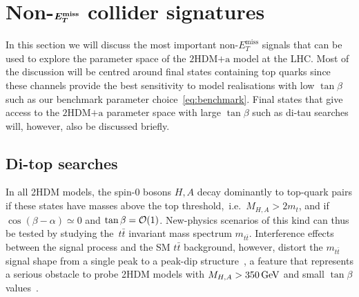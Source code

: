 \documentclass[a4paper, 11pt,notoc]{article}
\newcommand{\MET}{\ensuremath{E_T^\mathrm{miss}}\xspace}
\newcommand{\hdma}{\ensuremath{\textrm{2HDM+a}}\xspace}
\def\bm#1{\mbox{\boldmath$#1$\unboldmath}}
\begin{document}

\section{Non-$\bm{E_T^{\rm miss}}$ collider signatures}
\label{sec:nonMET}

In this section we will discuss the most important non-$\MET$ signals that can be used to explore the parameter space of the \hdma model at the LHC. Most of the discussion will be centred around final states containing top quarks since these channels provide the best sensitivity to model realisations with low $\tan \beta$ such as our benchmark parameter choice~\eqref{eq:benchmark}. Final states that give access to the \hdma parameter space with large $\tan \beta$ such as di-tau searches will, however, also be discussed briefly. 

\subsection{Di-top  searches}
\label{sec:ttbarresonances}

 In all 2HDM models, the spin-0 bosons $H,A$  decay dominantly to top-quark pairs if these states have masses above the top threshold,~i.e.~$M_{H, A} > 2 m_t$, and if $\cos (\beta - \alpha) \simeq 0$ and $\tan \beta = {\cal O}(1)$. New-physics scenarios of this kind can thus be tested by studying the~$t \bar t$ invariant mass spectrum $m_{t \bar t}$.  Interference effects between the signal process and the SM  $t \bar t$ background, however,  distort the $m_{t \bar t}$ signal shape from a single peak to a peak-dip structure~\cite{Gaemers:1984sj,Dicus:1994bm,Bernreuther:1997gs,Frederix:2007gi,Hespel:2016qaf,BuarqueFranzosi:2017jrj}, a feature that represents a serious obstacle to probe 2HDM models with $M_{H,A} > 350 \, {\rm GeV}$ and small $\tan \beta$ values~\cite{Craig:2015jba,Hajer:2015gka,Gori:2016zto,Carena:2016npr}. 
\end{document}
